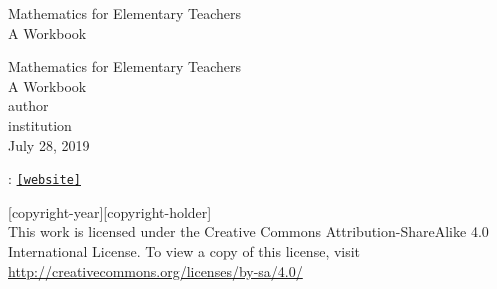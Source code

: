 \documentclass[twoside,11pt,]{book}
\newcommand{\mono}[1]{\texttt{#1}}
\begin{document}
\frontmatter
\thispagestyle{empty}
{\centering
\vspace*{0.28\textheight}
{\Huge Mathematics for Elementary Teachers}\\[2\baselineskip]
{\LARGE A Workbook}\\
}
\clearpage
\thispagestyle{empty}
\null%
\clearpage
\thispagestyle{empty}
{\centering
\vspace*{0.14\textheight}
{\Huge Mathematics for Elementary Teachers}\\[\baselineskip]
{\LARGE A Workbook}\\[3\baselineskip]
{\Large \textbraceleft{}author\textbraceright{}}\\[0.5\baselineskip]
{\Large \textbraceleft{}institution\textbraceright{}}\\[3\baselineskip]
{\Large July 28, 2019}\\}
\clearpage
\thispagestyle{empty}
\hypertarget{g:colophon:idm211749335408}{}
: \href{[website]}{\mono{[website]}}\par\medskip
\noindent\textcopyright{}[copyright-year]\quad{}[copyright-holder]\\[0.5\baselineskip]
 This work is licensed under the Creative Commons Attribution-ShareAlike 4.0 International License. To view a copy of this license, visit \href{http://creativecommons.org/licenses/by-sa/4.0/}{http:\slash{}\slash{}creativecommons.org\slash{}licenses\slash{}by-sa\slash{}4.0\slash{}}\par\medskip
{}
\null\clearpage
\setcounter{tocdepth}{2}
\renewcommand*\contentsname{Contents}
\tableofcontents
\mainmatter
%
%
\typeout{************************************************}
\typeout{************************************************}
%
\end{document}

